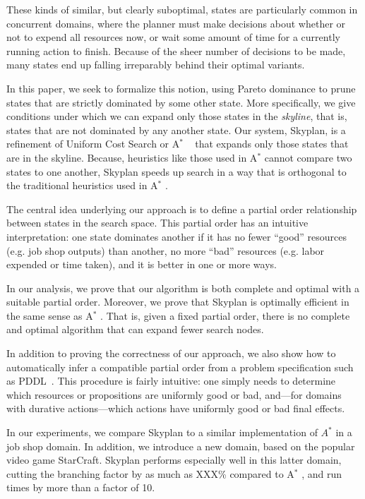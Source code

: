 \documentclass[letterpaper]{article}
\theoremstyle{plain} \newtheorem{theorem}{Theorem} \newtheorem{proposition}{Proposition} \newtheorem{lemma}{Lemma}
\theoremstyle{definition} \newtheorem{definition}{Definition} \newtheorem{conjecture}{Conjecture} \newtheorem*{example}{Example}
\theoremstyle{remark} \newtheorem*{remark}{Remark} \newtheorem*{note}{Note} \newtheorem{case}{Case}
\newcommand{\Astar}{A$^*$ }
\begin{document}
These kinds of similar, but clearly suboptimal, states are particularly
common in concurrent domains, where the planner must make decisions
about whether or not to expend all resources now, or wait some
amount of time for a currently running action to finish. Because
of the sheer number of decisions to be made, many states
end up falling irreparably behind their optimal variants.

In this paper, we seek to formalize this notion, using Pareto
dominance to prune states that are strictly dominated by some other
state. More specifically, we give conditions under which we can
expand only those states in the \textit{skyline}, that is, states
that are not dominated by any another state. Our system, Skyplan,
is a refinement of Uniform Cost Search or \Astar~\citep{astar} that
expands only those states that are in the skyline. Because, heuristics like
those used in \Astar cannot compare two states to one another, Skyplan
speeds up search in a way that is orthogonal to the traditional heuristics used in \Astar.

The central idea underlying our approach is to define a partial
order relationship between states in the search space. This partial
order has an intuitive interpretation: one state dominates another
if it has no fewer ``good'' resources (e.g. job shop outputs) than
another, no more ``bad'' resources (e.g. labor expended or time
taken), and it is better in one or more ways. 


In our analysis, we prove that our algorithm is both complete and
optimal with a suitable partial order. Moreover, we prove that
Skyplan is optimally efficient in the same sense as \Astar. That
is, given a fixed partial order, there is no complete and optimal
algorithm that can expand fewer search nodes.

In addition to proving the correctness of our approach, we also
show how to automatically infer a compatible partial order from a problem
specification such as PDDL~\citep{ghallab1998pddl,fox2003pddl2}.
This procedure is fairly intuitive: one simply needs to determine
which resources or propositions are uniformly good or bad, and---for 
domains with durative actions---which actions have uniformly
good or bad final effects.

In our experiments, we compare Skyplan to a similar implementation
of $A^*$ in a job shop domain. In addition, we introduce a new
domain, based on the popular video game StarCraft. Skyplan performs
especially well in this latter domain, cutting the branching factor
by as much as XXX\% compared to \Astar, and run times by more
than a factor of 10.
\end{document}
